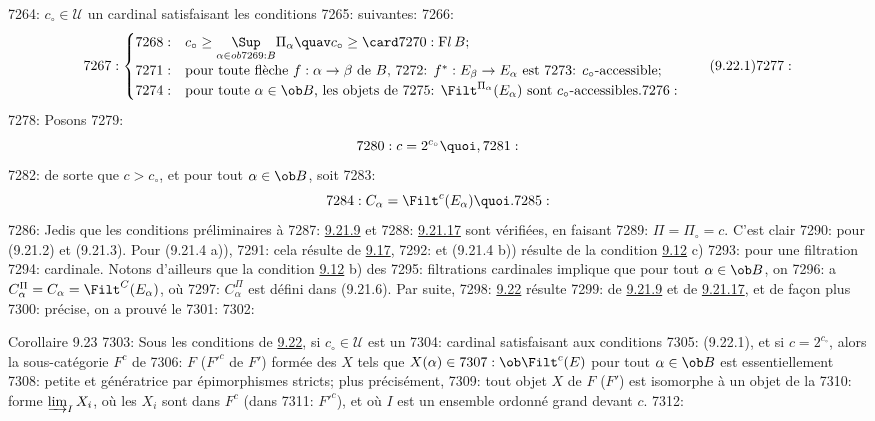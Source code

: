 7264: $c_{\circ}\in 𝒰$ un cardinal satisfaisant les conditions
7265: suivantes:
7266: \begin{equation}
7267: \begin{cases}
7268: & c_{\circ}\geq {\displaystyle{\mathop{\Sup}_{\alpha\in ob
7269: B}}}\Pi_{\alpha}{\quav} c_{\circ}\geq \card %
7270: \mathrm{F}{}l\, B;\\
7271: & \mbox{pour toute flèche $f:\alpha\rightarrow \beta$ de $B$,
7272: $f^\ast:E_{\beta}\rightarrow E_{\alpha}$ est
7273: $c_{\circ}$-accessible;}\\
7274: & \mbox{pour toute $\alpha\in \ob B$, les objets de
7275: $\Filt^{\Pi_{\alpha}}(E_{\alpha})$ sont $c_\circ$-accessibles.}
7276: \end{cases}\tag{9.22.1}
7277: \end{equation}
7278: Posons
7279: $$
7280: c=2^{c_{\circ}}{\quoi},
7281: $$
7282: de sorte que $c>c_{\circ}$, et pour tout $\alpha\in \ob B$, soit
7283: $$
7284: C_{\alpha}=\Filt^c(E_{\alpha}){\quoi}.
7285: $$
7286: Je\pageoriginale dis que les conditions préliminaires à
7287: \hyperref[I.lem9.21.9]{9.21.9} et
7288: \hyperref[I.lem9.21.17]{9.21.17} sont vérifiées, en faisant
7289: $\Pi=\Pi_{\circ}=c$. C'est clair
7290: pour (9.21.2) et (9.21.3). Pour (9.21.4 a)),
7291: cela résulte de \hyperref[I.cor9.17]{9.17},
7292: et (9.21.4 b)) résulte de la condition \hyperref[I.def9.12]{9.12} c)
7293: pour une filtration
7294: cardinale. Notons d'ailleurs que la condition \hyperref[I.def9.12]{9.12} b) des
7295: filtrations cardinales implique que pour tout $\alpha\in \ob B$, on
7296: a $C^{\Pi}_{\alpha}=C_{\alpha}=\Filt^C(E_{\alpha})$, où
7297: $C^{\Pi}_{\alpha}$ est défini dans (9.21.6). Par suite,
7298: \hyperref[I.them9.22]{9.22} résulte
7299: de \hyperref[I.lem9.21.9]{9.21.9} et de \hyperref[I.lem9.21.17]{9.21.17}, et de façon plus
7300: précise, on a prouvé le
7301: 
7302: \begin{enonce*}{Corollaire 9.23}
7303: Sous les conditions de \hyperref[I.them9.22]{9.22}, si $c_{\circ}\in 𝒰$ est un
7304: cardinal satisfaisant aux conditions
7305: (9.22.1), et si $c=2^{c_{\circ}}$, alors la sous-catégorie $F^c$ de
7306: $F$ (\resp ${F'}^c$ de $F'$) formée des $X$ tels que $X(\alpha)\in
7307: \ob \Filt^c(E)$ pour tout $\alpha\in \ob B$ est essentiellement
7308: petite et génératrice par épimorphismes stricts; plus précisément,
7309: tout objet $X$ de $F$ (\resp $F'$) est isomorphe à un objet de la
7310: forme $\varinjlim_I X_i$, où les $X_i$ sont dans $F^c$ (\resp dans
7311: ${F'}^c$), et où $I$ est un ensemble ordonné grand devant $c$.
7312: \end{enonce*}
